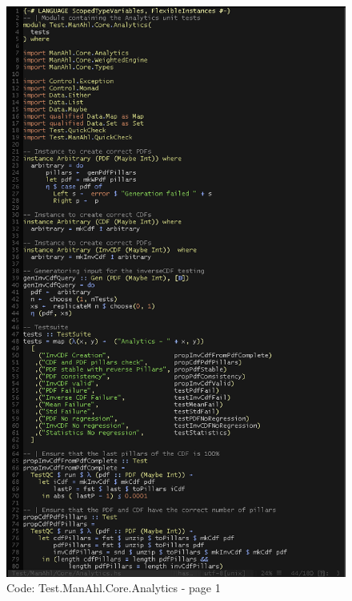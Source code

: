 \documentclass[12pt,a4paper,article]{memoir} %
\begin{document}
\begin{figure}[h!]
\centering
\includegraphics[width=1\textwidth]{img/code-test-analytics-1.png}
\caption{Code: Test.ManAhl.Core.Analytics - page 1}
\label{fig:test.a1}
\end{figure}
\end{document}
